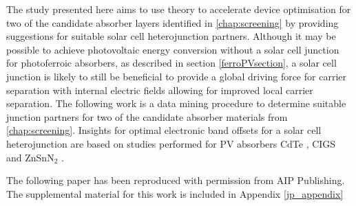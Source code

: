 \documentclass[11pt, twoside]{report}
\begin{document}
 The study presented here aims to use theory to accelerate device optimisation for two of the candidate absorber layers identified in \autoref{chap:screening} by providing suggestions for suitable solar cell heterojunction partners. 
Although it may be possible to achieve photovoltaic energy conversion without a solar cell junction for photoferroic absorbers, as described in section \ref{ferroPVsection}, a solar cell junction is likely to still be beneficial to provide a global driving force for carrier separation with internal electric fields allowing for improved local carrier separation. The following work is a data mining procedure to determine suitable junction partners for two of the candidate absorber materials from \autoref{chap:screening}. Insights for optimal electronic band offsets for a solar cell heterojunction are based on studies performed for PV absorbers CdTe \cite{CdTe_spike}, CIGS \cite{p-type_spike} and ZnSnN$_2$ \cite{Elisabetta}.

The following paper has been reproduced with permission from AIP Publishing. The supplemental material for this work is included in Appendix \ref{jp_appendix}





\end{document}
